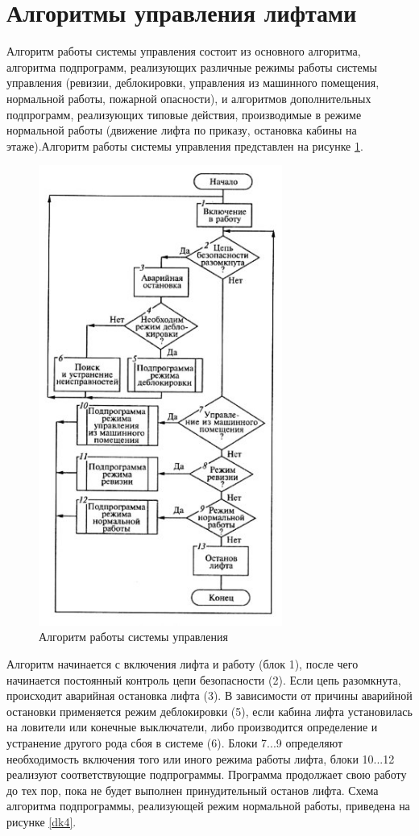 \section{Алгоритмы управления лифтами}

	Алгоритм работы системы управления состоит из основного алгоритма, алгоритма подпрограмм,
		реализующих различные режимы работы системы управления (ревизии, деблокировки,
		управления из машинного помещения, нормальной работы, пожарной опасности),
		и алгоритмов дополнительных подпрограмм, реализующих типовые действия,
		производимые в режиме нормальной работы (движение лифта по приказу, остановка кабины на этаже).Алгоритм работы системы управления представлен на рисунке \ref{dk3}.
        
        \begin{figure}[h]
				\centering
				\includegraphics[width=80mm]{src/pictures/algoritm_raboti_sistemi_upravlenia.jpg}
				\caption{Алгоритм работы системы управления}\label{dk3}
        \end{figure}
        
    Алгоритм начинается с включения лифта и работу (блок 1), после чего начинается постоянный контроль цепи безопасности (2). Если        цепь разомкнута, происходит аварийная остановка лифта (3). В зависимости от причины аварийной остановки применяется режим        деблокировки (5), если кабина лифта установилась на ловители или конечные выключатели, либо производится определение и            устранение другого рода сбоя в системе (6). Блоки 7...9 определяют необходимость включения того или иного режима работы          лифта, блоки 10...12 реализуют соответствующие подпрограммы. Программа продолжает свою работу до тех пор, пока не будет          выполнен принудительный останов лифта.
    Схема алгоритма подпрограммы, реализующей режим нормальной работы, приведена на рисунке \ref{dk4}.
    
